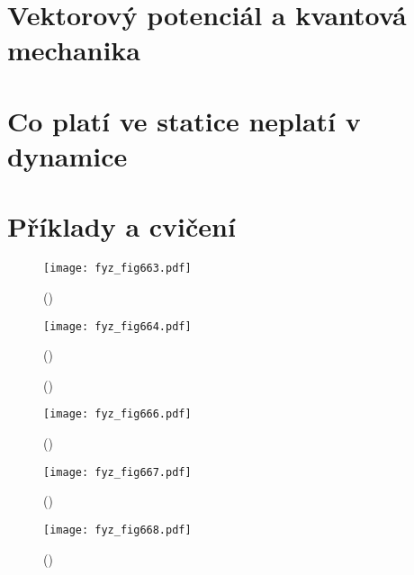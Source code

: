   \section{Vektorový potenciál a kvantová mechanika}\label{fyz:IIchapXVsecV}
  \section{Co platí ve statice neplatí v dynamice}\label{fyz:IIchapXVsecVI}
  \section{Příklady a cvičení}\label{fyz:IIchapXVsecVII}

    \begin{figure}[ht!] %
      \centering
      \texttt{[image: fyz\_fig663.pdf]}
      \caption{
               (\cite[s.~707]{Feynman02})}
      \label{fyz:fig663}
    \end{figure}

    \begin{figure}[ht!] %
      \centering
      \texttt{[image: fyz\_fig664.pdf]}
      \caption{
               (\cite[s.~707]{Feynman02})}
      \label{fyz:fig664}
    \end{figure}

    \begin{figure}[ht!]
      \centering
                     \newline
      \label{fyz:fig665}
      \caption{
               (\cite[s.~748]{Feynman02})}
    \end{figure}

    \begin{figure}[ht!] %
      \centering
      \texttt{[image: fyz\_fig666.pdf]}
      \caption{
               (\cite[s.~707]{Feynman02})}
      \label{fyz:fig666}
    \end{figure}

    \begin{figure}[ht!] %
      \centering
      \texttt{[image: fyz\_fig667.pdf]}
      \caption{
               (\cite[s.~707]{Feynman02})}
      \label{fyz:fig667}
    \end{figure}


    \begin{figure}[ht!] %
      \centering
      \texttt{[image: fyz\_fig668.pdf]}
      \caption{
               (\cite[s.~707]{Feynman02})}
      \label{fyz:fig668}
    \end{figure}

